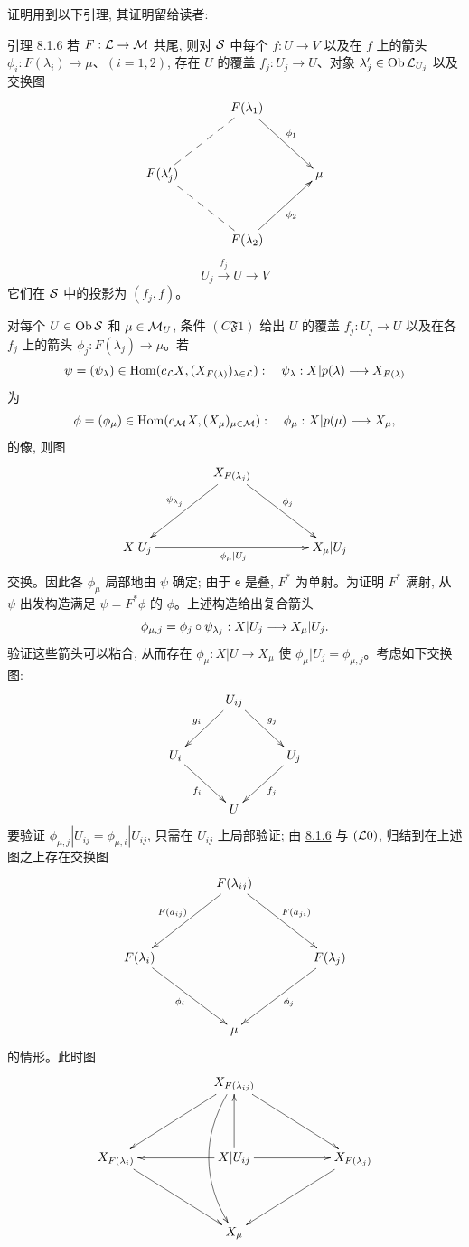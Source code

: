 证明用到以下引理, 其证明留给读者:

\begin{enonce*}{引理 8.1.6}
若 $F:\Ll\to\Mm$ 共尾, 则对 ${\mathcal S}$ 中每个 $f:U\to V$ 以及在 $f$ 上的箭头 $\phi_i:F(\lambda_i)\to\mu$、$(i=1,2)$, 存在 $U$ 的覆盖 $f_j:U_j\to U$、对象 $\lambda'_j\in\operatorname{Ob}{\mathcal L}_{U_j}$ 以及交换图
\[
\xymatrix@=1.25cm{
              & F(\lambda_1)   \ar[rd]^{\phi_1}&\\
F(\lambda'_j) \ar@{--}[ru] \ar@{--}[rd]&                & \mu\\
              & F(\lambda_2) \ar[ru]_{\phi_2}  &
}
\]
$$
U_j\xrightarrow{f_j}U\to V
$$
它们在 ${\mathcal S}$ 中的投影为 $(f_j,f)$。
\end{enonce*}

对每个 $U\in\operatorname{Ob}{\mathcal S}$ 和 $\mu\in{\mathcal M}_U$, 条件 $(C\mathfrak{F}1)$ 给出 $U$ 的覆盖 $f_j:U_j\to U$ 以及在各 $f_j$ 上的箭头 $\phi_j:F(\lambda_j)\to\mu$。若
$$
\psi=(\psi_\lambda)\in\Hom(c_{\Ll}X,
(X_{F(\lambda)})_{\lambda\in\Ll}):\quad
\psi_\lambda:X|p(\lambda)\to X_{F(\lambda)}
$$
为
$$
\phi=(\phi_\mu)\in\Hom(c_{\Mm}X,(X_\mu)_{\mu\in\Mm}):\quad
\phi_\mu:X|p(\mu)\to X_\mu,
$$
的像, 则图
\[
\xymatrix@=1.5cm{
                               & X_{F(\lambda_j)}
                               \ar[ld]_{\psi_{\lambda_j}} \ar[rd]^{\phi_j}&        \\
X|U_j \ar[rr]_{\phi_\mu|U_j} &                  & X_\mu|U_j
}
\]
交换。因此各 $\phi_\mu$ 局部地由 $\psi$ 确定; 由于 $\mathsf{e}$ 是叠, $F^{\ast}$ 为单射。为证明 $F^{\ast}$ 满射, 从 $\psi$ 出发构造满足 $\psi=F^{\ast}\phi$ 的 $\phi$。上述构造给出复合箭头
$$
\phi_{\mu,j}=\phi_j\circ\psi_{\lambda_j}:X|U_j\to X_\mu|U_j{\quoi}.
$$
验证这些箭头可以粘合, 从而存在 $\phi_\mu:X|U\to X_\mu$ 使 $\phi_\mu|U_j=\phi_{\mu,j}$。考虑如下交换图:
\[
\xymatrix@=1cm{
                 & U_{ij}\ar[ld]_{g_i} \ar[rd]^{g_j}     &            \\
U_i  \ar[rd]_{f_i}            &            & U_j \ar[ld]^{f_j}\\
                 & U     &
}
\]
要\pageoriginale 验证 $\phi_{\mu,j}|U_{ij}=\phi_{\mu,i}|U_{ij}$, 只需在 $U_{ij}$ 上局部验证; 由 \hyperref[V.lem8.1.6]{8.1.6} 与 $({\mathcal L}0)$, 归结到在上述图之上存在交换图
\[
\xymatrix@=1.5cm{
             & F(\lambda_{ij}) \ar[ld]_{F(a_{ij})} \ar[rd]^{F(a_{ji})} &\\
F(\lambda_i) \ar[rd]_{\phi_i}&                 & F(\lambda_j) \ar[ld]^{\phi_j}\\
             & \mu             &
}
\]
的情形。此时图
\[
\xymatrix@R=1.5cm@C=2cm{
  & X_{F(\lambda_{ij})} \ar[ld] \ar[rd] \ar@/_1.68pc/[dd]&\\
X_{F(\lambda_i)}\ar[rd] & X|U_{ij}\ar[u]\ar[l]\ar[r] & X_{F(\lambda_j)} \ar[ld]\\
                 & X_\mu &
}
\]
